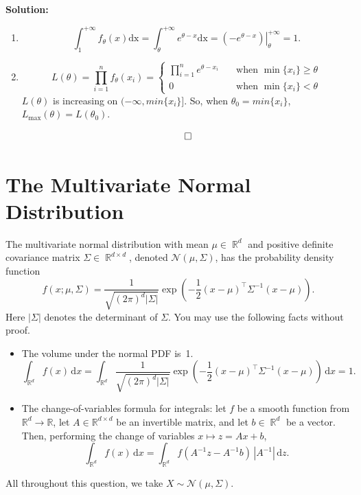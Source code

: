 \documentclass{article}
\newcommand{\Question}[1]{\Large \section{ #1 } \normalsize}
\DeclareMathOperator{\R}{\mathbb{R}}
\newenvironment{solution}{\color{blue} \smallskip \textbf{Solution:}}{}
\begin{document}
\begin{enumerate}
    \begin{solution}
        \begin{enumerate}
            \item 
            $$
            \int_{1}^{+\infty} f_{\theta}(x) \mathrm{dx} = \int_{\theta}^{+\infty} e^{\theta - x} \mathrm{dx} = \left. (-e^{\theta - x}) \right| _{\theta}^{+\infty}=1.
            $$
            \item
            $$
            L(\theta) =  \prod_{i=1}^n f_{\theta}(x_i) = \begin{cases} 
                \prod_{i=1}^n e^{\theta - x_i} \quad &\text{when } \min\{x_i\} \geq \theta \\
                0 \quad &\text{when } \min\{x_i\} < \theta
            \end{cases}
            $$
            $L(\theta)$ is increasing on $(-\infty, min\{x_i\}]$. So, when $\theta_0 = min\{x_i\}$, $L_{\max}(\theta) = L(\theta_0)$.
        \end{enumerate}
        \[ \qedhere \]
    \end{solution}

\end{enumerate}

\newpage
\Question{The Multivariate Normal Distribution}

The multivariate normal distribution with mean $\mu \in \R^d$ and positive definite covariance matrix $\Sigma \in \R^{d\times d}$, denoted $\mathcal{N}(\mu, \Sigma)$, has the probability density function
\[
    f(x; \mu, \Sigma) = \frac{1}{\sqrt{(2\pi)^d|\Sigma|}} \exp\left(-\frac{1}{2} (x - \mu)^\top \Sigma^{-1} (x - \mu)\right).
\]
Here $|\Sigma|$ denotes the determinant of $\Sigma$. 
You may use the following facts without proof.
\begin{itemize}
    \item 
    The volume under the normal PDF is~1.
    \[
        \int_{\R^d} f(x)\,\mathrm dx = \int_{\R^d} \frac{1}{\sqrt{(2\pi)^d|\Sigma|}} \exp\left(-\frac{1}{2} (x - \mu)^\top \Sigma^{-1} (x - \mu)\right)\,\mathrm dx = 1.
    \]
    \item 
    The change-of-variables formula for integrals: let $f$ be a smooth function from $\mathbb R^d \to \mathbb R$,  let $A\in\mathbb R^{d \times d}$ be an invertible matrix, and let $b \in \R^d$ be a vector. 
    Then, performing the change of variables $x \mapsto z = Ax + b$,  
    \[
        \int_{\R^d} f(x)\, \mathrm dx = \int_{\R^d} f(A^{-1}z - A^{-1}b)\, |A^{-1}| \,\mathrm dz.
    \]
\end{itemize}
All throughout this question, we take $X \sim \mathcal{N}(\mu, \Sigma)$.
\end{document}
